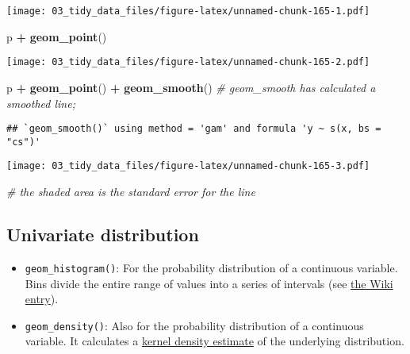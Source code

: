 \documentclass[
]{book}
\newenvironment{Shaded}{\begin{snugshade}}{\end{snugshade}}
\newcommand{\CommentTok}[1]{\textcolor[rgb]{0.56,0.35,0.01}{\textit{#1}}}
\newcommand{\KeywordTok}[1]{\textcolor[rgb]{0.13,0.29,0.53}{\textbf{#1}}}
\newcommand{\NormalTok}[1]{#1}
\newcommand{\OperatorTok}[1]{\textcolor[rgb]{0.81,0.36,0.00}{\textbf{#1}}}
\newcommand{\StringTok}[1]{\textcolor[rgb]{0.31,0.60,0.02}{#1}}
\providecommand{\tightlist}{%
  \setlength{\itemsep}{0pt}\setlength{\parskip}{0pt}}
\begin{document}
\texttt{[image: 03\_tidy\_data\_files/figure-latex/unnamed-chunk-165-1.pdf]}

\begin{Shaded}
\begin{Highlighting}[]
\NormalTok{p }\OperatorTok{+}\StringTok{ }\KeywordTok{geom\_point}\NormalTok{()}
\end{Highlighting}
\end{Shaded}

\texttt{[image: 03\_tidy\_data\_files/figure-latex/unnamed-chunk-165-2.pdf]}

\begin{Shaded}
\begin{Highlighting}[]
\NormalTok{p }\OperatorTok{+}\StringTok{ }\KeywordTok{geom\_point}\NormalTok{() }\OperatorTok{+}\StringTok{ }\KeywordTok{geom\_smooth}\NormalTok{() }\CommentTok{\# geom\_smooth has calculated a smoothed line;}
\end{Highlighting}
\end{Shaded}

\begin{verbatim}
## `geom_smooth()` using method = 'gam' and formula 'y ~ s(x, bs = "cs")'
\end{verbatim}

\texttt{[image: 03\_tidy\_data\_files/figure-latex/unnamed-chunk-165-3.pdf]}

\begin{Shaded}
\begin{Highlighting}[]
\CommentTok{\# the shaded area is the standard error for the line}
\end{Highlighting}
\end{Shaded}

\hypertarget{univariate-distribution}{%
\subsection{Univariate distribution}\label{univariate-distribution}}

\begin{itemize}
\tightlist
\item
  \texttt{geom\_histogram()}: For the probability distribution of a continuous variable. Bins divide the entire range of values into a series of intervals (see \href{https://en.wikipedia.org/wiki/Histogram}{the Wiki entry}).
\item
  \texttt{geom\_density()}: Also for the probability distribution of a continuous variable. It calculates a \href{https://en.wikipedia.org/wiki/Kernel_density_estimation}{kernel density estimate} of the underlying distribution.
\end{itemize}
\end{document}
